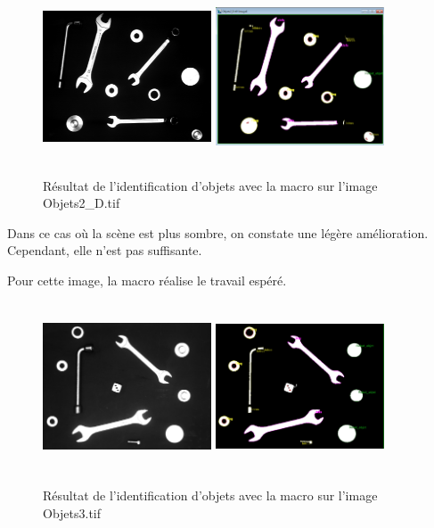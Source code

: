 \documentclass{scrreprt}
\begin{document}
\begin{figure}[!h]
\centering
\includegraphics[width=5cm, height=5cm]{images/objet2Do.png}\hfill
\includegraphics[width=5cm, height=5cm]{images/objet2D.png}
\caption{Résultat de l'identification d'objets avec la macro sur l'image Objets2_D.tif}
\end{figure}

Dans ce cas où la scène est plus sombre, on constate une légère amélioration.
Cependant, elle n'est pas suffisante.

\newpage
Pour cette image, la macro réalise le travail espéré.
\begin{figure}[!h]
\centering
\includegraphics[width=5cm, height=5cm]{images/objet3o.png}\hfill
\includegraphics[width=5cm, height=5cm]{images/objet3.png}
\caption{Résultat de l'identification d'objets avec la macro sur l'image Objets3.tif}
\end{figure}
\end{document}
